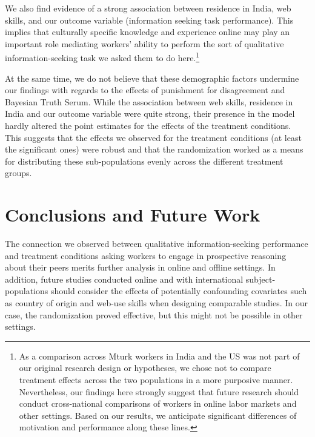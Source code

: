 \documentclass{cscw2010}
\begin{document}
We also find evidence of a strong association between residence in
India, web skills, and our outcome variable (information seeking task
performance). This implies that culturally specific knowledge and
experience online may play an important role mediating workers'
ability to perform the sort of qualitative information-seeking task we
asked them to do here.\footnote{As a comparison across Mturk workers
  in India and the US was not part of our original research design
  or hypotheses, we chose not to compare treatment effects across the
  two populations in a more purposive manner. Nevertheless, our
  findings here strongly suggest that future research should conduct
  cross-national comparisons of workers in online labor markets and
  other settings. Based on our results, we anticipate significant
  differences of motivation and performance along these
  lines.\cite{antin2011desirability}}

At the same time, we do not believe that these demographic factors
undermine our findings with regards to the effects of punishment for
disagreement and Bayesian Truth Serum. While the association between
web skills, residence in India and our outcome variable were quite
strong, their presence in the model hardly altered the point estimates
for the effects of the treatment conditions. This suggests that the
effects we observed for the treatment conditions (at least the
significant ones) were robust and that the randomization worked as a
means for distributing these sub-populations evenly across the
different treatment groups.


\section{Conclusions and Future Work}

The connection we observed between qualitative information-seeking
performance and treatment conditions asking workers to engage in
prospective reasoning about their peers merits further analysis in
online and offline settings. In addition, future studies conducted
online and with international subject-populations should consider the
effects of potentially confounding covariates such as country of
origin and web-use skills when designing comparable studies. In our
case, the randomization proved effective, but this might not be
possible in other settings. 
\end{document}
